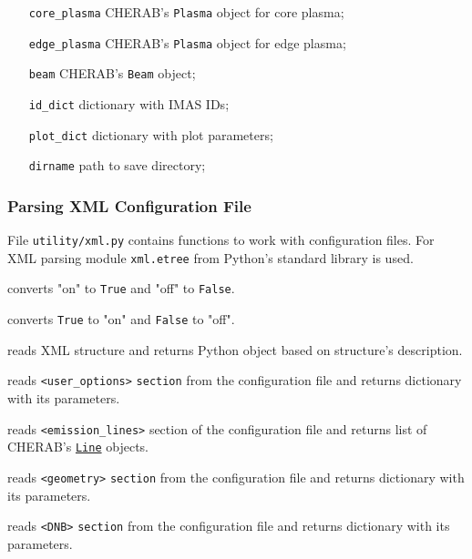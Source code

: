 \documentclass[../../main.tex]{subfiles}
\begin{document}
\begin{itemize}[align=left]
    \item[\texttt{core\_plasma}] CHERAB's \texttt{Plasma} object for core plasma;
    \item[\texttt{edge\_plasma}] CHERAB's \texttt{Plasma} object for edge plasma;
    \item[\texttt{beam}] CHERAB's \texttt{Beam} object;
    \item[\texttt{id\_dict}] dictionary with IMAS IDs;
    \item[\texttt{plot\_dict}] dictionary with plot parameters;
    \item[\texttt{dirname}] path to save directory;
\end{itemize}

\subsubsection{Parsing XML Configuration File}%
\label{sec:xml}

File \texttt{utility/xml.py} contains functions to work with configuration files. For XML parsing module \texttt{xml.etree} from Python's standard library is used.

converts "on" to \texttt{True} and "off" to \texttt{False}.

converts \texttt{True} to "on" and \texttt{False} to "off".

reads XML structure and returns Python object based on structure's description.

reads \texttt{<user\_options>} \texttt{section} from the configuration file and returns dictionary with its parameters.

reads \texttt{<emission\_lines>} section of the configuration file and returns list of CHERAB's \href{https://cherab.github.io/documentation/atomic/emission_lines.html?highlight=line#cherab.core.atomic.line.Line}{\texttt{Line}} objects.

reads \texttt{<geometry>} \texttt{section} from the configuration file and returns dictionary with its parameters.

reads \texttt{<DNB>} \texttt{section} from the configuration file and returns dictionary with its parameters.
\end{document}
